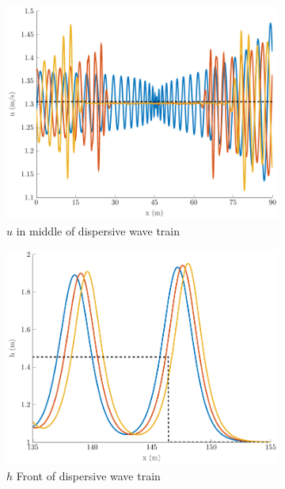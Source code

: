 \documentclass[10pt]{elsarticle}
\begin{document}
\begin{figure}
\begin{subfigure}{0.32\textwidth}
	\centering
	\includegraphics[width=\textwidth]{./Figures/Simulations/Study/ImpDisp/uMiddle.pdf}
	\caption{$u$ in middle of dispersive wave train}
	\end{subfigure}
	\begin{subfigure}{0.32\textwidth}
	\centering
	\includegraphics[width=\textwidth]{./Figures/Simulations/Study/ImpDisp/hFront.pdf}
	\caption{$h$ Front of dispersive wave train}
	\end{subfigure}
	\begin{subfigure}{0.32\textwidth}
	\centering

\end{subfigure}
\end{figure}
\end{document}

